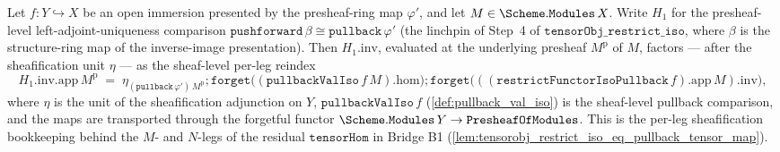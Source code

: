 \begin{lemma}\leanok
  \label{lem:h1inv_app_eq_pullbackval_restrict}
  Let \(f : Y \hookrightarrow X\) be an open immersion presented by the presheaf-ring map
  \(\varphi'\), and let \(M \in \Scheme.\mathtt{Modules}\,X\). Write \(H_1\) for the presheaf-level
  left-adjoint-uniqueness comparison \(\mathtt{pushforward}\,\beta \cong
  \mathtt{pullback}\,\varphi'\) (the linchpin of Step~4 of \(\mathtt{tensorObj\_restrict\_iso}\),
  where \(\beta\) is the structure-ring map of the inverse-image presentation). Then \(H_1.\mathrm{inv}\),
  evaluated at the underlying presheaf \(M^{\mathrm p}\) of \(M\), factors --- after the sheafification
  unit \(\eta\) --- as the sheaf-level per-leg reindex
  \[
    H_1.\mathrm{inv}.\mathrm{app}\,M^{\mathrm p}
      \;=\; \eta_{(\mathtt{pullback}\,\varphi')\,M^{\mathrm p}}
        \mathbin{;} \mathtt{forget}\bigl((\mathtt{pullbackValIso}\,f\,M).\mathrm{hom}\bigr)
        \mathbin{;} \mathtt{forget}\bigl(((\mathtt{restrictFunctorIsoPullback}\,f).\mathrm{app}\,M).\mathrm{inv}\bigr),
  \]
  where \(\eta\) is the unit of the sheafification adjunction on \(Y\), \(\mathtt{pullbackValIso}\,f\)
  (\cref{def:pullback_val_iso}) is the sheaf-level pullback comparison, and the maps are transported
  through the forgetful functor \(\Scheme.\mathtt{Modules}\,Y \to \mathtt{PresheafOfModules}\). This is
  the per-leg sheafification bookkeeping behind the \(M\)- and \(N\)-legs of the residual
  \(\mathtt{tensorHom}\) in Bridge B1 (\cref{lem:tensorobj_restrict_iso_eq_pullback_tensor_map}).
\end{lemma}
